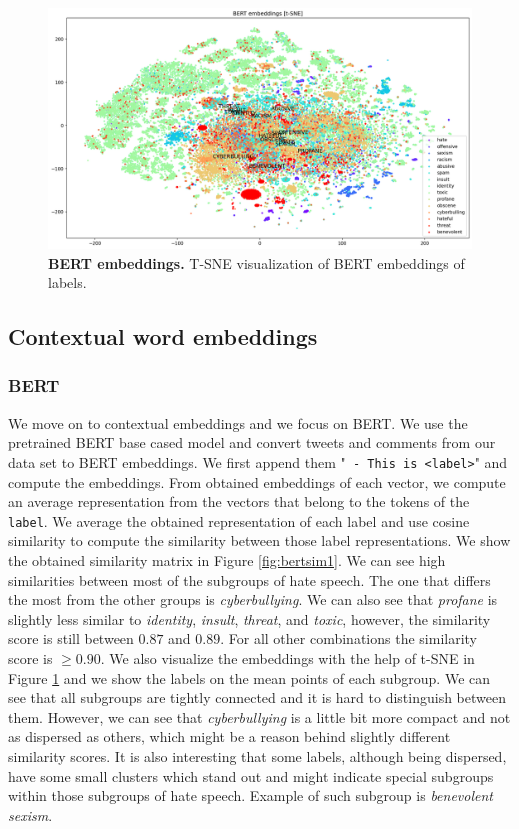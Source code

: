\documentclass[fleqn,moreauthors,10pt]{ds_report}
\begin{document}
\begin{figure}[htb]\centering
	\includegraphics[width=\linewidth]{bert_tsne.png}
	\caption{\textbf{BERT embeddings.} T-SNE visualization of BERT embeddings of labels.}
	\label{fig:berttsne}
\end{figure}

\subsection{Contextual word embeddings}

\subsubsection{BERT}
We move on to contextual embeddings and we focus on BERT. We use the pretrained BERT base cased model \cite{dbpl} and convert tweets and comments from our data set to BERT embeddings. We first append them "\texttt{ - This is <label>}" and compute the embeddings. From obtained embeddings of each vector, we compute an average representation from the vectors that belong to the tokens of the \texttt{label}. We average the obtained representation of each label and use cosine similarity to compute the similarity between those label representations. We show the obtained similarity matrix in Figure \ref{fig:bertsim1}. We can see high similarities between most of the subgroups of hate speech. The one that differs the most from the other groups is \textit{cyberbullying}. We can also see that \textit{profane} is slightly less similar to \textit{identity}, \textit{insult}, \textit{threat}, and \textit{toxic}, however, the similarity score is still between $0.87$ and $0.89$. For all other combinations the similarity score is $\ge 0.90$. We also visualize the embeddings with the help of t-SNE in Figure \ref{fig:berttsne} and we show the labels on the mean points of each subgroup. We can see that all subgroups are tightly connected and it is hard to distinguish between them. However, we can see that \textit{cyberbullying} is a little bit more compact and not as dispersed as others, which might be a reason behind slightly different similarity scores. It is also interesting that some labels, although being dispersed, have some small clusters which stand out and might indicate special subgroups within those subgroups of hate speech. Example of such subgroup is \textit{benevolent sexism}.
\end{document}
